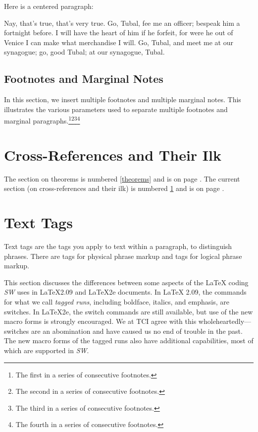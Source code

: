 \documentclass{article}
\begin{document}
Here is a centered paragraph:

\begin{center}
Nay, that's true, that's very true. Go, Tubal, fee me an officer; bespeak
him a fortnight before. I will have the heart of him if he forfeit, for were
he out of Venice I can make what merchandise I will. Go, Tubal, and meet me
at our synagogue; go, good Tubal; at our synagogue, Tubal.
\end{center}

\subsection{Footnotes and Marginal Notes}

In this section, we insert multiple footnotes and multiple marginal notes.
This illustrates the various parameters used to separate multiple footnotes
and marginal paragraphs.\footnote{%
The first in a series of consecutive footnotes.}\footnote{%
The second in a series of consecutive footnotes.}\footnote{%
The third in a series of consecutive footnotes.}\footnote{%
The fourth in a series of consecutive footnotes.}%
%
%
%

\section{Cross-References and Their Ilk}

\label{crossrefs}The section on theorems is numbered \ref{theorems} and is
on page \pageref{theorems}. The current section (on cross-references and
their ilk) is numbered \ref{crossrefs} and is on page \pageref{crossrefs}.

\section{Text Tags}

Text tags are the tags you apply to text within a paragraph, to distinguish
phrases. There are tags for physical phrase markup and tags for logical
phrase markup.

This section discusses the differences between some aspects of the \LaTeX{}
coding \textsl{SW\/} uses in \LaTeX{}2.09 and \LaTeX{}2e documents. In \LaTeX%
{}2.09, the commands for what we call \emph{tagged runs}, including
boldface, italics, and emphasis, are switches. In \LaTeX{}2e, the switch
commands are still available, but use of the new macro forms is strongly
encouraged. We at TCI agree with this wholeheartedly---switches are an
abomination and have caused us no end of trouble in the past. The new macro
forms of the tagged runs also have additional capabilities, most of which
are supported in \textsl{SW}.
\end{document}
